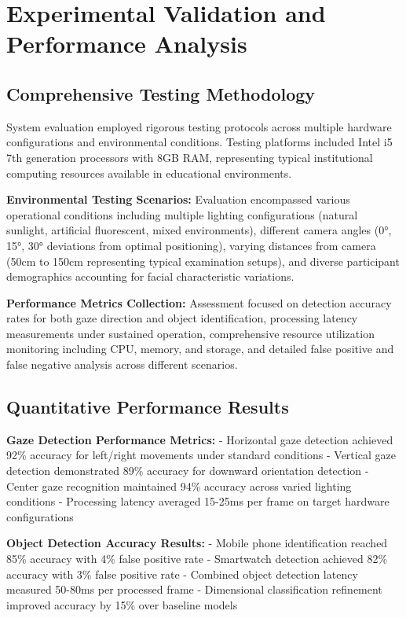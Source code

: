 \documentclass[conference]{IEEEtran}
\begin{document}
\section{Experimental Validation and Performance Analysis}

\subsection{Comprehensive Testing Methodology}

System evaluation employed rigorous testing protocols across multiple hardware configurations and environmental conditions. Testing platforms included Intel i5 7th generation processors with 8GB RAM, representing typical institutional computing resources available in educational environments.

\textbf{Environmental Testing Scenarios:} Evaluation encompassed various operational conditions including multiple lighting configurations (natural sunlight, artificial fluorescent, mixed environments), different camera angles (0°, 15°, 30° deviations from optimal positioning), varying distances from camera (50cm to 150cm representing typical examination setups), and diverse participant demographics accounting for facial characteristic variations.

\textbf{Performance Metrics Collection:} Assessment focused on detection accuracy rates for both gaze direction and object identification, processing latency measurements under sustained operation, comprehensive resource utilization monitoring including CPU, memory, and storage, and detailed false positive and false negative analysis across different scenarios.

\subsection{Quantitative Performance Results}

\textbf{Gaze Detection Performance Metrics:}
- Horizontal gaze detection achieved 92\% accuracy for left/right movements under standard conditions
- Vertical gaze detection demonstrated 89\% accuracy for downward orientation detection
- Center gaze recognition maintained 94\% accuracy across varied lighting conditions
- Processing latency averaged 15-25ms per frame on target hardware configurations

\textbf{Object Detection Accuracy Results:}
- Mobile phone identification reached 85\% accuracy with 4\% false positive rate
- Smartwatch detection achieved 82\% accuracy with 3\% false positive rate
- Combined object detection latency measured 50-80ms per processed frame
- Dimensional classification refinement improved accuracy by 15\% over baseline models
\end{document}
